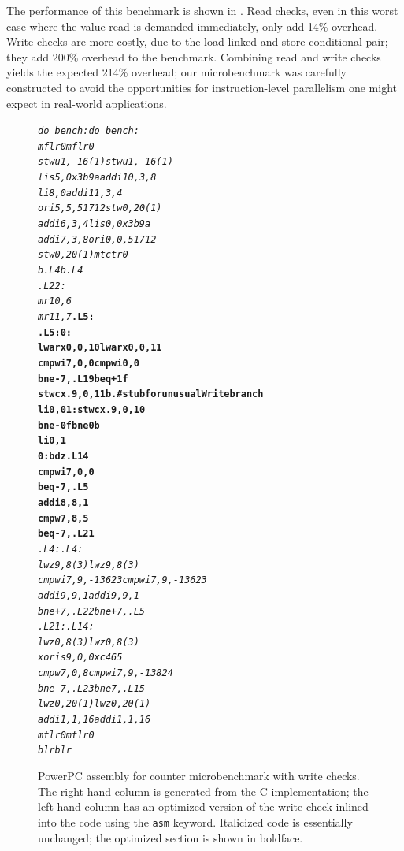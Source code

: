 
The performance of this benchmark is shown in .
Read checks, even in this worst case where the value read is demanded
immediately, only add 14\% overhead.  Write checks are more costly,
due to the load-linked and store-conditional pair; they add 200\%
overhead to the benchmark.  Combining read and write checks yields the
expected 214\% overhead; our microbenchmark was carefully constructed to
avoid the opportunities for instruction-level parallelism one might
expect in real-world applications.

\begin{figure}
\sis\fontsize{9}{10}\begin{alltt}
\textit{do_bench:              do_bench:
  mflr 0                 mflr 0
  stwu 1,-16(1)          stwu 1,-16(1)
  lis 5,0x3b9a           addi 10,3,8
  li 8,0                 addi 11,3,4
  ori 5,5,51712          stw 0,20(1)
  addi 6,3,4             lis 0,0x3b9a
  addi 7,3,8             ori 0,0,51712
  stw 0,20(1)            mtctr 0
  b .L4                  b .L4
.L22:
  mr 10,6
  mr 11,7              }\textbf{.L5:
.L5:                   0:
  lwarx 0,0,10           lwarx 0,0,11
  cmpwi 7,0,0            cmpwi 0,0
  bne- 7,.L19            beq+ 1f
  stwcx. 9,0,11          b . # stub for unusualWrite branch
  li 0,0               1:stwcx. 9,0,10
  bne- 0f                bne 0b
  li 0,1
0:                       bdz .L14
  cmpwi 7,0,0
  beq- 7,.L5
  addi 8,8,1
  cmpw 7,8,5
  beq- 7,.L21}\textit{
.L4:                   .L4:
  lwz 9,8(3)             lwz 9,8(3)
  cmpwi 7,9,-13623       cmpwi 7,9,-13623
  addi 9,9,1             addi 9,9,1
  bne+ 7,.L22            bne+ 7,.L5
.L21:                  .L14:
  lwz 0,8(3)             lwz 0,8(3)
                         xoris 9,0,0xc465
  cmpw 7,0,8             cmpwi 7,9,-13824
  bne- 7,.L23            bne 7,.L15
  lwz 0,20(1)            lwz 0,20(1)
  addi 1,1,16            addi 1,1,16
  mtlr 0                 mtlr 0             
  blr                    blr}
\end{alltt}
\caption[PowerPC assembly for counter microbenchmark with
  write checks.]{PowerPC assembly for counter microbenchmark with
  write checks.  The right-hand column is generated from the C
  implementation; the left-hand column has an optimized version of the
  write check inlined into the code using the \texttt{asm} keyword.
  Italicized code is essentially unchanged; the optimized section is
  shown in boldface.}
\label{fig:write-assem}
\end{figure}
